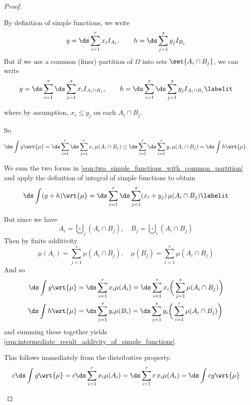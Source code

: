 \documentclass{article} %
\begin{document}
\begin{proof}


\begin{alphabate}
\item By definition of simple functions, we write \[g = \ds\sum_{i=1}^r x_i I_{A_i} ,\quad \quad h = \ds\sum_{j=1}^s y_j I_{B_j}  \]	
But if we use a common (finer) partition of $\Omega$ into sets $\set{A_i \cap B_j}$, we can write
\begin{align*}
g = \ds\sum_{i=1}^r \ds\sum_{j=1}^s x_i I_{A_i \cap B_j} ,\quad \quad h = \ds\sum_{i=1}^r \ds\sum_{j=1}^s y_j I_{A_i \cap B_j}  
\labelit \label{eqn:two_simple_functions_with_common_partition}
\end{align*}

where by assumption, $x_i \leq y_j$ on each $A_i \cap B_j$.	
	
So 
\begin{align*}
\ds\int g \wrt{\mu}  = \ds\sum_{i=1}^r \ds\sum_{j=1}^s x_i \, \mu(A_i \cap B_j)  \leq \ds\sum_{i=1}^r \ds\sum_{j=1}^s y_i \, \mu(A_i \cap B_j) = \ds\int h \wrt{\mu}.
\end{align*}

\item We sum the two forms in \eqref{eqn:two_simple_functions_with_common_partition} and apply the definition of integral of simple functions to obtain
\begin{align*}
\ds\int (g+h) \wrt{\mu} = \ds\sum_{i=1}^r \ds\sum_{j=1}^s (x_i + y_j) \, \mu(A_i \cap B_j)
\labelit \label{eqn:intermediate_result_addivity_of_simple_functions}
\end{align*}

But since we have 
\[A_i =\bigcupdot_j (A_i \cap B_j), \quad  B_j =\bigcupdot_i (A_i \cap B_j)\]
Then by finite additivity
\[\mu(A_i) =\sum_{j=1}^s \mu(A_i \cap B_j), \quad  \mu(B_j) =\sum_{i=1}^r \mu(A_i \cap B_j)\]
And so
\begin{align*}
\ds\int g \wrt{\mu} &= \ds\sum_{i=1}^r x_i \mu(A_i) = \ds\sum_{i=1}^r x_i \bigg(\sum_{j=1}^s \mu(A_i \cap B_j)\bigg) \\	
\ds\int h \wrt{\mu} &= \ds\sum_{j=1}^s y_i \mu(B_i) = \ds\sum_{j=1}^s y_i \bigg(\sum_{i=1}^r \mu(A_i \cap B_j)\bigg) \\	
\end{align*}
and summing these together yields \eqref{eqn:intermediate_result_addivity_of_simple_functions}.
\item This follows immediately from the distributive property.
\[ c \ds\int g \wrt{\mu} = c \ds\sum_{i=1}^r x_i \mu(A_i) =  \ds\sum_{i=1}^r c \, x_i \mu(A_i) = \ds\int cg \wrt{\mu} \]
\end{alphabate}

\end{proof}
\end{document}
